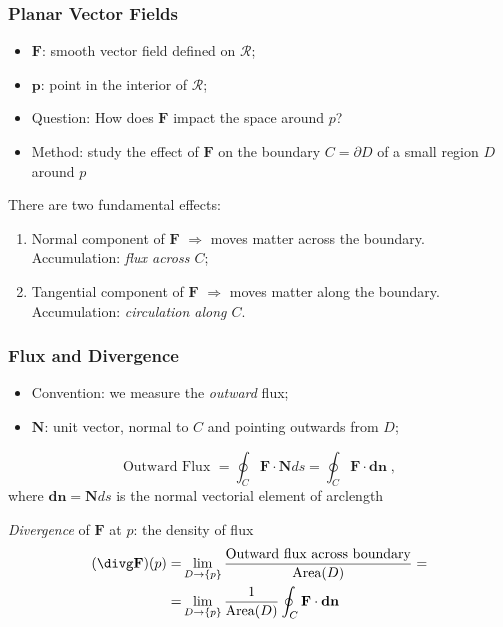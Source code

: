 \begin{frame}
  \frametitle{Planar Vector Fields}

    \begin{itemize}
      \item $\textbf{F}$: smooth vector field defined on $\mathcal{R}$;
      \item $\textbf{p}$: point in the interior of $\mathcal{R}$;
      \item Question: How does $\textbf{F}$ impact the space around $p$?
      \item \pause Method: study the effect of $\textbf{F}$ on the boundary $C =\partial D$ of a small region $D$ around $p$
    \end{itemize}

  \pause There are two fundamental effects:

\begin{enumerate}
  \item \pause Normal component of $\textbf{F}$ $\Longrightarrow$ moves matter across the boundary. Accumulation: \emph{flux across $C$};

  \item \pause Tangential component of $\textbf{F}$ $\Longrightarrow$ moves matter along the boundary. Accumulation: \emph{circulation along $C$}.
\end{enumerate}

\end{frame}

\begin{frame}
  \frametitle{Flux and Divergence}

    \begin{itemize}
      \item Convention: we measure the \emph{outward} flux;
      \item $\textbf{N}$: unit vector, normal to $C$ and pointing outwards from $D$;
    \end{itemize}
%
$$\text{Outward Flux } = \oint_C \textbf{F} \cdot \textbf{N} ds = \oint_C \textbf{F} \cdot \textbf{dn} \; ,$$
%
where $\textbf{dn} =\textbf{N} ds$ is the normal vectorial element of arclength

\medskip

\pause \emph{Divergence} of $\textbf{F}$ at $p$: the density of flux
%
\begin{align*}
  (\divg \textbf{F})(p) = & \lim_{D \to \{p\}} \frac{\text{Outward flux across boundary}}{\text{Area}(D)} = \\ = & \lim_{D\to \{p\}} \frac{1}{\text{Area}(D)} \oint_C \textbf{F} \cdot \textbf{dn}
\end{align*}
\end{frame}




